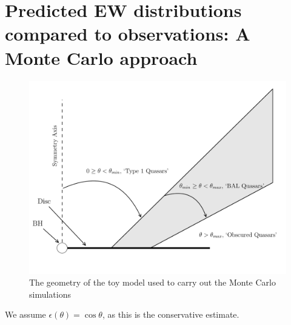 






\section{Predicted EW distributions compared to observations: A Monte Carlo approach}
\label{sec:mc_angular}

\begin{figure}
\centering
\includegraphics[width=1.0\textwidth]{figures/ewpaper/fig2_cartoon.png}
\caption
{
The geometry of the toy model used to carry out the Monte Carlo simulations
}
\label{fig:cartoon}
\end{figure}


We assume
$\epsilon(\theta) = \cos \theta$, as this is the conservative estimate. 

